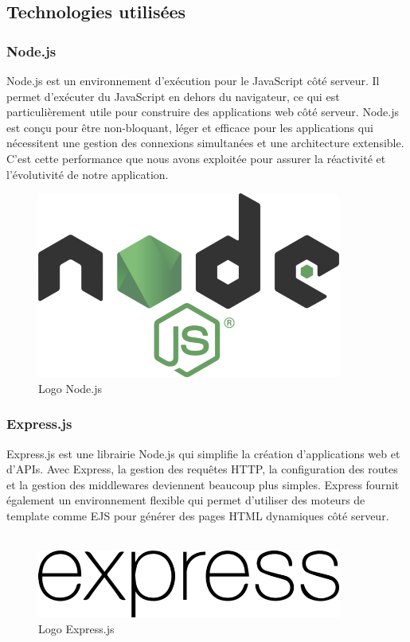 \subsection*{Technologies utilisées}
\subsubsection*{Node.js}
Node.js est un environnement d'exécution pour le JavaScript côté serveur. Il permet d'exécuter du JavaScript en dehors du navigateur, ce qui est particulièrement utile pour construire des applications web côté serveur. Node.js est conçu pour être non-bloquant, léger et efficace pour les applications qui nécessitent une gestion des connexions simultanées et une architecture extensible. C'est cette performance que nous avons exploitée pour assurer la réactivité et l'évolutivité de notre application.

\begin{figure}[H]
\begin{center}
\includegraphics[width=10cm]{assets/presentation/Node_logo_NodeJS-700x428.png}
\end{center}
\caption{Logo Node.js}
\end{figure}

\subsubsection*{Express.js}
Express.js est une librairie Node.js qui simplifie la création d'applications web et d'APIs. Avec Express, la gestion des requêtes HTTP, la configuration des routes et la gestion des middlewares deviennent beaucoup plus simples. Express fournit également un environnement flexible qui permet d'utiliser des moteurs de template comme EJS pour générer des pages HTML dynamiques côté serveur.\\\\

\begin{figure}[H]
\begin{center}
\includegraphics[width=10cm]{assets/presentation/express.js_Logo-700x156.png}
\end{center}
\caption{Logo Express.js}
\end{figure}


